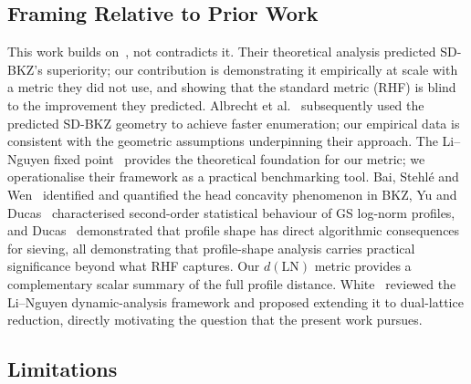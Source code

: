 \documentclass[journal=cic,version=preprint]{iacrj}
\begin{document}
\subsection{Framing Relative to Prior Work}

This work builds on~\cite{EC:MicWal16}, not contradicts it. Their theoretical analysis predicted SD-BKZ's superiority; our contribution is demonstrating it empirically at scale with a metric they did not use, and showing that the standard metric (RHF) is blind to the improvement they predicted. Albrecht et al.~\cite{C:ABFKSW20} subsequently used the predicted SD-BKZ geometry to achieve faster enumeration; our empirical data is consistent with the geometric assumptions underpinning their approach. The Li--Nguyen fixed point~\cite{EPRINT:LiNgu20} provides the theoretical foundation for our metric; we operationalise their framework as a practical benchmarking tool. Bai, Stehl\'{e} and Wen~\cite{AC:BaiSteWen18} identified and quantified the head concavity phenomenon in BKZ, Yu and Ducas~\cite{SAC:YuDuc17} characterised second-order statistical behaviour of GS log-norm profiles, and Ducas~\cite{EC:Ducas18} demonstrated that profile shape has direct algorithmic consequences for sieving, all demonstrating that profile-shape analysis carries practical significance beyond what RHF captures. Our $d(\mathrm{LN})$ metric provides a complementary scalar summary of the full profile distance. White~\cite{White26} reviewed the Li--Nguyen dynamic-analysis framework and proposed extending it to dual-lattice reduction, directly motivating the question that the present work pursues.

\subsection{Limitations}
\label{sec:limitations}
\end{document}
